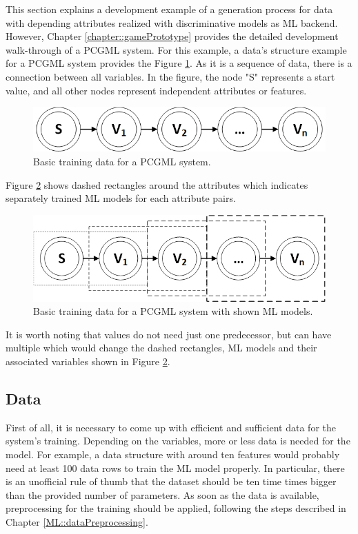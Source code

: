 \documentclass[MGS,Master,english]{twbook}%
\begin{document}
This section explains a development example of a generation process for data with depending attributes realized with discriminative models as ML backend. However, Chapter \ref{chapter::gamePrototype} provides the detailed development walk-through of a PCGML system. For this example, a data’s structure example for a PCGML system provides the Figure \ref{fig::PCGML::devExample::sequenceBase}. As it is a sequence of data, there is a connection between all variables. In the figure, the node "S" represents a start value, and all other nodes represent independent attributes or features. 
\begin{figure}[!htbp]
	\centering
	\includegraphics[width=0.5\linewidth]{PICs/PCGML_development_example_sequence_base}
	\caption{Basic training data for a PCGML system. }\label{fig::PCGML::devExample::sequenceBase}
\end{figure}
Figure \ref{fig::PCGML::devExample::sequenceWithModels} shows dashed rectangles around the attributes which indicates separately trained ML models for each attribute pairs. 
\begin{figure}[!htbp]
	\centering
	\includegraphics[width=0.55\linewidth]{PICs/PCGML_development_example_sequence_with_models}
	\caption{Basic training data for a PCGML system with shown ML models.}\label{fig::PCGML::devExample::sequenceWithModels}
\end{figure}
It is worth noting that values do not need just one predecessor, but can have multiple which would change the dashed rectangles, ML models and their associated variables shown in Figure \ref{fig::PCGML::devExample::sequenceWithModels}.

\subsection{Data}
First of all, it is necessary to come up with efficient and sufficient data for the system’s training. Depending on the variables, more or less data is needed for the model. For example, a data structure with around ten features would probably need at least 100 data rows to train the ML model properly. In particular, there is an unofficial rule of thumb that the dataset should be ten time times bigger than the provided number of parameters. As soon as the data is available, preprocessing for the training should be applied, following the steps described in Chapter \ref{ML::dataPreprocessing}.
\end{document}
